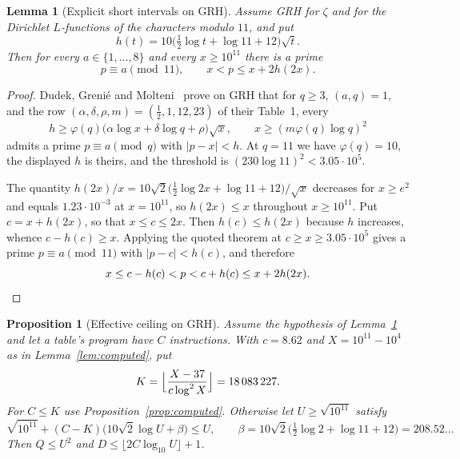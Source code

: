 \documentclass[11pt]{article}
\newtheorem{lemma}[theorem]{Lemma}
\newtheorem{proposition}[theorem]{Proposition}
\theoremstyle{remark}
\begin{document}
\begin{lemma}[Explicit short intervals on GRH]\label{lem:grh}
Assume GRH for $\zeta$ and for the Dirichlet $L$-functions of the characters
modulo $11$, and put
\[
  h(t)=10\bigl(\tfrac12\log t+\log11+12\bigr)\sqrt t .
\]
Then for every $a\in\{1,\ldots,8\}$ and every $x\ge10^{11}$ there is a prime
\[
  p\equiv a\pmod{11},\qquad x<p\le x+2h(2x).
\]
\end{lemma}

\begin{proof}
Dudek, Greni\'e and Molteni~\cite[Thm.~1.1]{dgm} prove on GRH that for
$q\ge3$, $(a,q)=1$, and the row $(\alpha,\delta,\rho,m)=(\frac12,1,12,23)$ of
their Table~1, every
\[
  h\ge\varphi(q)\bigl(\alpha\log x+\delta\log q+\rho\bigr)\sqrt x,
  \qquad x\ge(m\varphi(q)\log q)^2
\]
admits a prime $p\equiv a\pmod q$ with $|p-x|<h$.  At $q=11$ we have
$\varphi(q)=10$, the displayed $h$ is theirs, and the threshold is
$(230\log11)^2<3.05\cdot10^5$.

The quantity $h(2x)/x=10\sqrt2\bigl(\frac12\log2x+\log11+12\bigr)/\sqrt x$
decreases for $x\ge e^2$ and equals $1.23\cdot10^{-3}$ at $x=10^{11}$, so
$h(2x)\le x$ throughout $x\ge10^{11}$.  Put $c=x+h(2x)$, so that
$x\le c\le2x$.  Then $h(c)\le h(2x)$ because $h$ increases, whence
$c-h(c)\ge x$.  Applying the quoted theorem at $c\ge x\ge3.05\cdot10^5$ gives
a prime $p\equiv a\pmod{11}$ with $|p-c|<h(c)$, and therefore
\[
  x\le c-h(c)<p<c+h(c)\le x+2h(2x).\qedhere
\]
\end{proof}

\begin{proposition}[Effective ceiling on GRH]\label{prop:grh}
Assume the hypothesis of Lemma~\ref{lem:grh} and let a table's program have
$C$ instructions.  With $c=8.62$ and $X=10^{11}-10^4$ as in
Lemma~\ref{lem:computed}, put
\[
  K=\Bigl\lfloor\frac{X-37}{c\log^2X}\Bigr\rfloor=18\,083\,227 .
\]
For $C\le K$ use Proposition~\ref{prop:computed}.  Otherwise let
$U\ge\sqrt{10^{11}}$ satisfy
\[
  \sqrt{10^{11}}+(C-K)\bigl(10\sqrt2\log U+\beta\bigr)\le U,
  \qquad
  \beta=10\sqrt2\bigl(\tfrac12\log2+\log11+12\bigr)=208.52\ldots
\]
Then $Q\le U^2$ and $D\le\lfloor2C\log_{10}U\rfloor+1$.
\end{proposition}
\end{document}

